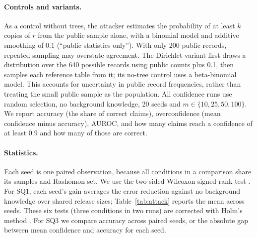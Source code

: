 \paragraph{Controls and variants.} As a control without trees, the attacker estimates the
  probability of at least $k$ copies of $r$ from the public sample alone, with a binomial
  model and additive smoothing of 0.1 (``public statistics only''). With only 200 public records, repeated sampling may overstate agreement.
  The Dirichlet variant first draws a distribution over the 640 possible records using
  public counts plus 0.1, then samples each reference table from it; its no-tree control
  uses a beta-binomial model. This accounts for uncertainty in public record frequencies,
  rather than treating the small public sample as the population. All confidence
  runs use random selection, no background knowledge, 20 seeds and $m\in\{10,25,50,100\}$.
  We report accuracy (the share of correct claims), overconfidence (mean confidence minus
  accuracy), AUROC, and how many claims reach a confidence of at least 0.9 and how many of
  those are correct.

\paragraph{Statistics.} Each seed is one paired observation, because all conditions in a
  comparison share its samples and Rashomon set. We use the two-sided Wilcoxon signed-rank
  test \citep{wilcoxon1945individual}. For SQ1, each seed's gain averages the error reduction against no background knowledge
  over shared release sizes; Table~\ref{tab:attack} reports the mean across seeds. These six tests
  (three conditions in two runs) are corrected with Holm's method \citep{holm1979multiple}.
  For SQ3 we compare accuracy across paired seeds, or the absolute gap between mean
  confidence and accuracy for each seed.
